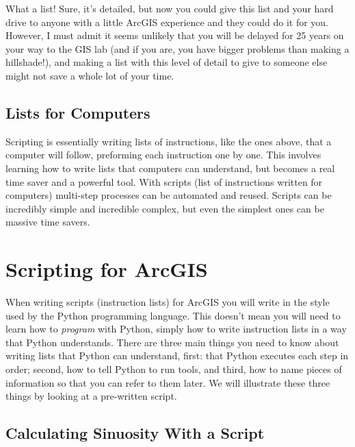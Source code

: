 \documentclass{article}
\begin{document}
What a list!  Sure, it's detailed, but now you could give this list and your hard drive to anyone with a little ArcGIS experience and they could do it for you.  However, I must admit it seems unlikely that you will be delayed for 25 years on your way to the GIS lab (and if you are, you have bigger problems than making a hillshade!), and making a list with this level of detail to give to someone else might not save a whole lot of your time.  

\subsection{Lists for Computers}
Scripting is essentially writing lists of instructions, like the ones above, that a computer will follow, preforming each instruction one by one.  This involves learning how to write lists that computers can understand, but becomes a real time saver and a powerful tool.  With scripts (list of instructions written for computers) multi-step processes can be automated and reused.  Scripts can be incredibly simple and incredible complex, but even the simplest ones can be massive time savers.

\section{Scripting for ArcGIS}
When writing scripts (instruction lists) for ArcGIS you will write in the style used by the Python programming language.  This doesn't mean you will need to learn how to \textit{program} with Python, simply how to write instruction lists in a way that Python understands.  There are three main things you need to know about writing lists that Python can understand, first: that Python executes each step in order; second, how to tell Python to run tools, and third, how to name pieces of information so that you can refer to them later.  We will illustrate these three things by looking at a pre-written script.
\subsection{Calculating Sinuosity With a Script}
\end{document}
